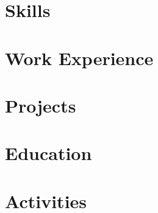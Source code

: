 \documentclass[a4paper,10pt]{article}
\begin{document}
% 

\section{Skills}


\section{Work Experience}


\section{Projects}


\section{Education}



\section{Activities}

\end{document}
